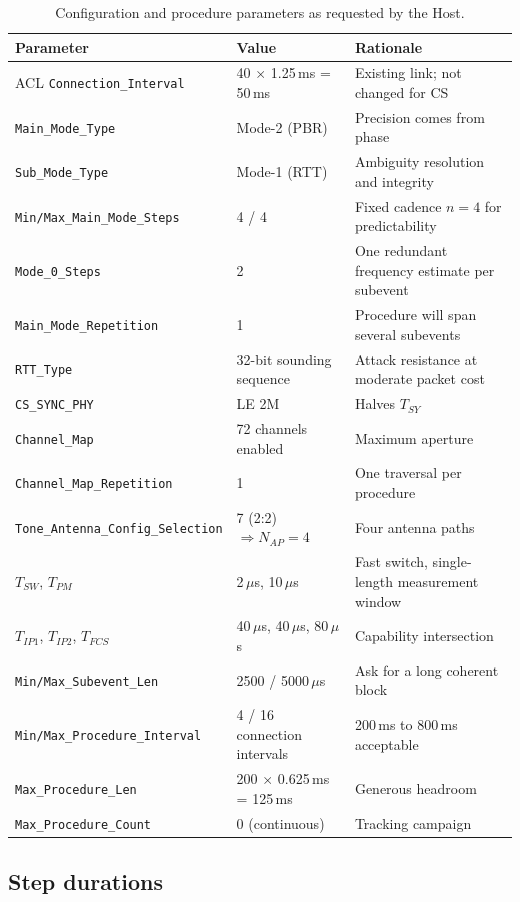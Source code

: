 \documentclass[11pt,a4paper]{article}
\newcommand{\us}{\,\ensuremath{\upmu}s}
\newcommand{\code}[1]{\texttt{\small #1}}
\newcommand{\Tsy}{T_{SY}}
\newcommand{\Tip}{T_{IP1}}
\newcommand{\Tipp}{T_{IP2}}
\newcommand{\Tfcs}{T_{FCS}}
\newcommand{\Tsw}{T_{SW}}
\newcommand{\Tpm}{T_{PM}}
\newcommand{\Nap}{N_{AP}}
\providecommand{\upmu}{\mu}
\begin{document}
\begin{table}[h]
\caption{Configuration and procedure parameters as requested by the Host.}
\label{tab:wex-in}
\centering\small
\begin{tabular}{@{}L{54mm}L{34mm}L{50mm}@{}}
\toprule
Parameter & Value & Rationale \\
\midrule
ACL \code{Connection\_Interval} & 40 $\times$ 1.25\,ms = 50\,ms & Existing link; not changed for CS \\
\code{Main\_Mode\_Type} & Mode-2 (PBR) & Precision comes from phase \\
\code{Sub\_Mode\_Type} & Mode-1 (RTT) & Ambiguity resolution and integrity \\
\code{Min/Max\_Main\_Mode\_Steps} & 4 / 4 & Fixed cadence $n=4$ for predictability \\
\code{Mode\_0\_Steps} & 2 & One redundant frequency estimate per subevent \\
\code{Main\_Mode\_Repetition} & 1 & Procedure will span several subevents \\
\code{RTT\_Type} & 32-bit sounding sequence & Attack resistance at moderate packet cost \\
\code{CS\_SYNC\_PHY} & LE 2M & Halves $\Tsy$ \\
\code{Channel\_Map} & 72 channels enabled & Maximum aperture \\
\code{Channel\_Map\_Repetition} & 1 & One traversal per procedure \\
\code{Tone\_Antenna\_Config\_Selection} & 7 (2:2) $\Rightarrow \Nap = 4$ & Four antenna paths \\
$\Tsw$, $\Tpm$ & 2\us, 10\us & Fast switch, single-length measurement window \\
$\Tip$, $\Tipp$, $\Tfcs$ & 40\us, 40\us, 80\us & Capability intersection \\
\code{Min/Max\_Subevent\_Len} & 2500 / 5000\us & Ask for a long coherent block \\
\code{Min/Max\_Procedure\_Interval} & 4 / 16 connection intervals & 200\,ms to 800\,ms acceptable \\
\code{Max\_Procedure\_Len} & 200 $\times$ 0.625\,ms = 125\,ms & Generous headroom \\
\code{Max\_Procedure\_Count} & 0 (continuous) & Tracking campaign \\
\bottomrule
\end{tabular}
\end{table}

\subsection{Step durations}
\end{document}

